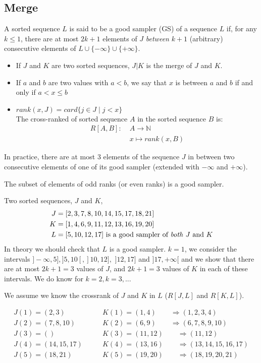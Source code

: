\subsection{Merge}
\begin{defi}
A sorted sequence $L$ is said to be a good sampler (GS) of a sequence $L$ if, for any $k \leq 1$, there are at most $2k+1$ elements of $J$ \emph{between} $k+1$ (arbitrary) consecutive elements of $L \cup \{-\infty \} \cup \{+\infty\}$.

\begin{itemize}
\item If $J$ and $K$ are two sorted sequences, $J|K$ is the merge of $J$ and $K$.
\item If $a$ and $b$ are two values with $a<b$, we say that $x$ is between $a$ and $b$ if and only if $a<x\leq b$
\item $rank(x,J)=card \{j\in J \;|\; j<x \}$\\
The cross-ranked of sorted sequence $A$ in the sorted sequence $B$ is:
\begin{align*}
R[A,B]: \; & A\to \mathbb{N}\\
& x\mapsto rank(x,B)
\end{align*}
\end{itemize}
\end{defi}
In practice, there are at most 3 elements of the sequence $J$ in between two consecutive elements of one of its good sampler (extended with $-\infty$ and $+\infty$).

 The subset of elements of odd ranks (or even ranks) is a good sampler.


Two sorted sequences, $J$ and $K$, 
\begin{align*}
J & =[2,3,7,8,10,14,15,17,18,21]\\
K & = [1,4,6,9,11,12,13,16,19,20]\\
L & = [5,10,12,17] \text{ is a good sampler of \emph{both} $J$ and $K$}
\end{align*}
In theory we should check that $L$ is a good sampler. $k=1$, we consider the intervals $]-\infty ,5], ]5,10[, ]10,12],$ $]12,17]$ and $]17,+\infty [$ and we show that there are at most $2k+1=3$ values of $J$, and $2k+1=3$ values of $K$ in each of these intervals.
We do know for $k=2, k=3,...$

We assume we know the crossrank of $J$ and $K$ in $L$ ($R[J,L]$ and $R[K,L]$).

\begin{align*}
J(1) = (2,3) & \qquad K(1)=(1,4) \qquad\Rightarrow (1,2,3,4) \\
J(2)=(7,8,10) & \qquad K(2)=(6,9) \qquad\Rightarrow (6,7,8,9,10)\\
J(3)=() & \qquad K(3)=(11,12) \qquad\Rightarrow (11,12)\\
J(4)=(14,15,17) & \qquad K(4)=(13,16) \qquad\Rightarrow (13,14,15,16,17)\\
J(5)=(18,21) & \qquad K(5)=(19,20) \qquad\Rightarrow (18,19,20,21)\\
\end{align*}

